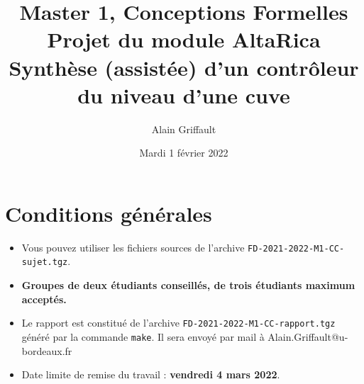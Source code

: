 \documentclass[a4paper]{article}
\newcommand{\altarica}{{\sc AltaRica}}
\begin{document}
\title{Master 1, Conceptions Formelles\\
Projet du module \altarica\\
Synthèse (assistée) d'un contrôleur du niveau d'une cuve}

\date{Mardi 1 février 2022}

\author{Alain Griffault}

\maketitle



\section{Conditions générales}

\begin{itemize}
\item Vous pouvez utiliser les fichiers sources de l'archive {\tt FD-2021-2022-M1-CC-sujet.tgz}.
\item {\bf Groupes de deux étudiants conseillés, de trois étudiants maximum acceptés.}
\item Le rapport est constitué de l'archive {\tt FD-2021-2022-M1-CC-rapport.tgz} généré par la commande {\tt make}. Il sera envoyé par mail à Alain.Griffault@u-bordeaux.fr
\item Date limite de remise du travail : {\bf vendredi 4 mars 2022}.
\end{itemize}
\end{document}
